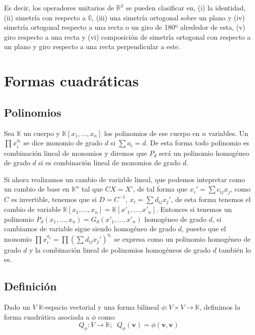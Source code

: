 \documentclass{preset}
\begin{document}
Es decir, los operadores unitarios de $\mathbb{R}^3$ se pueden clasificar en, (i) la identidad, (ii) simetría con respecto a $\mathbb{0}$, (iii) una simetría ortogonal sobre un plano y (iv) simetría ortogonal respecto a una recta o un giro de 180º alrededor de esta, (v) giro respecto a una recta y (vi) composición de simetría ortogonal con respecto a un plano y giro respecto a una recta perpendicular a este.
\clearpage

\vspace{-20pt}
\section{Formas cuadráticas}

\vspace{-15pt}
\subsection{Polinomios}
Sea $\mathbb{K}$ un cuerpo y $\mathbb{K}[x_1,\dots,x_n]$ los polinomios de ese cuerpo en $n$ variables. Un $\prod x_i^{a_i}$ se dice monomio de grado $d$ si $\sum a_i = d$. De esta forma todo polinomio es combinación lineal de monomios y diremos que $P_d$ será un polinomio homogéneo de grado $d$ si es combinación lineal de monomios de grado $d$.

Si ahora realizamos un cambio de variable lineal, que podemos intepretar como un cambio de base en $\mathbb{K}^n$ tal que $CX=X'$, de tal forma que $x_i' = \sum c_{ij} x_j $, como $C$ es invertible, tenemos que si $D=C^{-1}$, $x_i = \sum d_{ij} x_j'$, de esta forma tenemos el cambio de variable $\mathbb{K}[x_1,\dots,x_n]=\mathbb{K}[x'_1,\dots,x'_n]$. Entonces si tenemos un polinomio $P_d(x_1,\dots,x_n)=G_d(x'_1,\dots,x'_n)$ homogéneo de grado $d$, si cambiamos de variable sigue siendo homogéneo de grado $d$, puesto que el monomio $\prod x_i^{a_i}=\prod (\sum d_{ij} x_j')^{a_i}$ se expresa como un polinomio homogéneo de grado $d$ y la combinación lineal de polinomios homogéneos de grado $d$ también lo es.

\vspace{-15pt}
\subsection{Definición}

Dado un $V$ $\mathbb{K}$-espacio vectorial y una forma bilineal $\phi: V \times V \rightarrow \mathbb{K}$, definimos la forma cuadrática asociada a $\phi$ como:
\vspace{-15pt}
\[Q_\phi: V\rightarrow \mathbb{K}; \;\; Q_\phi(\textbf{v})=\phi(\textbf{v},\textbf{v})\]
\end{document}
